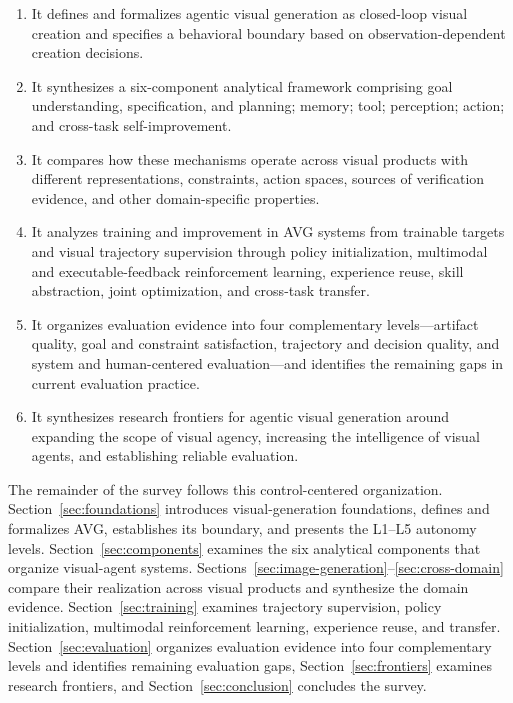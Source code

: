 \begin{enumerate}
  \item It defines and formalizes agentic visual generation as closed-loop visual creation and specifies a behavioral boundary based on observation-dependent creation decisions.
  \item It synthesizes a six-component analytical framework comprising goal understanding, specification, and planning; memory; tool; perception; action; and cross-task self-improvement.
  \item It compares how these mechanisms operate across visual products with different representations, constraints, action spaces, sources of verification evidence, and other domain-specific properties.
  \item It analyzes training and improvement in AVG systems from trainable targets and visual trajectory supervision through policy initialization, multimodal and executable-feedback reinforcement learning, experience reuse, skill abstraction, joint optimization, and cross-task transfer.
  \item It organizes evaluation evidence into four complementary levels---artifact quality, goal and constraint satisfaction, trajectory and decision quality, and system and human-centered evaluation---and identifies the remaining gaps in current evaluation practice.
  \item It synthesizes research frontiers for agentic visual generation around expanding the scope of visual agency, increasing the intelligence of visual agents, and establishing reliable evaluation.
\end{enumerate}

The remainder of the survey follows this control-centered organization. Section~\ref{sec:foundations} introduces visual-generation foundations, defines and formalizes AVG, establishes its boundary, and presents the L1--L5 autonomy levels. Section~\ref{sec:components} examines the six analytical components that organize visual-agent systems. Sections~\ref{sec:image-generation}--\ref{sec:cross-domain} compare their realization across visual products and synthesize the domain evidence. Section~\ref{sec:training} examines trajectory supervision, policy initialization, multimodal reinforcement learning, experience reuse, and transfer. Section~\ref{sec:evaluation} organizes evaluation evidence into four complementary levels and identifies remaining evaluation gaps, Section~\ref{sec:frontiers} examines research frontiers, and Section~\ref{sec:conclusion} concludes the survey.
